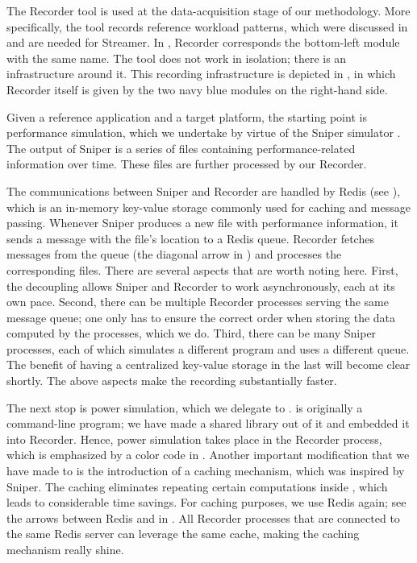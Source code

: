 
The Recorder tool is used at the data-acquisition stage of our methodology. More
specifically, the tool records reference workload patterns, which were discussed
in  and are needed for Streamer. In , Recorder
corresponds the bottom-left module with the same name. The tool does not work in
isolation; there is an infrastructure around it. This recording infrastructure
is depicted in , in which Recorder itself is given by the two
navy blue modules on the right-hand side.

Given a reference application and a target platform, the starting point is
performance simulation, which we undertake by virtue of the Sniper simulator
\cite{carlson2011}. The output of Sniper is a series of files containing
performance-related information over time. These files are further processed by
our Recorder.

The communications between Sniper and Recorder are handled by Redis (see
), which is an in-memory key-value storage commonly used for
caching and message passing. Whenever Sniper produces a new file with
performance information, it sends a message with the file's location to a Redis
queue. Recorder fetches messages from the queue (the diagonal arrow in
) and processes the corresponding files. There are several
aspects that are worth noting here. First, the decoupling allows Sniper and
Recorder to work asynchronously, each at its own pace. Second, there can be
multiple Recorder processes serving the same message queue; one only has to
ensure the correct order when storing the data computed by the processes, which
we do. Third, there can be many Sniper processes, each of which simulates a
different program and uses a different queue. The benefit of having a
centralized key-value storage in the last will become clear shortly. The above
aspects make the recording substantially faster.

The next stop is power simulation, which we delegate to 
\cite{li2009}.  is originally a command-line program; we have made a
shared library out of it and embedded it into Recorder. Hence, power simulation
takes place in the Recorder process, which is emphasized by a color code in
. Another important modification that we have made to 
is the introduction of a caching mechanism, which was inspired by Sniper. The
caching eliminates repeating certain computations inside , which leads
to considerable time savings. For caching purposes, we use Redis again; see the
arrows between Redis and  in . All Recorder processes
that are connected to the same Redis server can leverage the same cache, making
the caching mechanism really shine.

